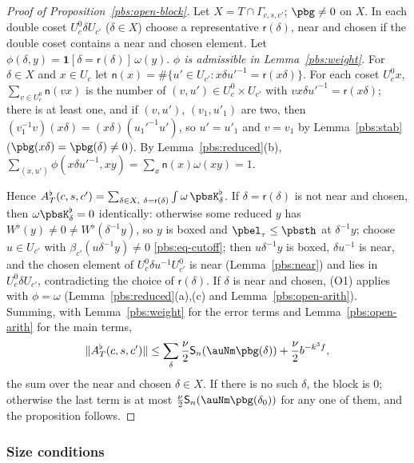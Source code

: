 \documentclass[10pt]{amsart}
\theoremstyle{definition}
\theoremstyle{remark}
\begin{document}
\begin{proof}[Proof of Proposition~\ref{pbs:open-block}]
Let $X=T\cap\Gamma_{c,s,c'}$; $\pbg\ne0$ on $X$. In each double coset $U^0_c\delta U_{c'}$ ($\delta\in X$)
choose a representative $\mathsf r(\delta)$, near and chosen if the double coset contains a near and chosen
element. Let $\phi(\delta,y)=\mathbf 1[\delta=\mathsf r(\delta)]\,\omega(y)$. \emph{$\phi$ is admissible in
Lemma~\ref{pbs:weight}.} For $\delta\in X$ and $x\in U_c$ let $\mathsf n(x)=\#\{u'\in U_{c'}:x\delta u'^{-1}=
\mathsf r(x\delta)\}$. For each coset $U^0_cx$, $\sum_{v\in U^0_c}\mathsf n(vx)$ is the number of $(v,u')\in
U^0_c\times U_{c'}$ with $vx\delta u'^{-1}=\mathsf r(x\delta)$; there is at least one, and if $(v,u')$,
$(v_1,u'_1)$ are two, then $(v_1^{-1}v)(x\delta)=(x\delta)(u_1'^{-1}u')$, so $u'=u'_1$ and $v=v_1$ by
Lemma~\ref{pbs:stab} ($\pbg(x\delta)=\pbg(\delta)\ne0$). By Lemma~\ref{pbs:reduced}(b),
$\sum_{(x,u')}\phi(x\delta u'^{-1},xy)=\sum_x\mathsf n(x)\omega(xy)=1$.

Hence $A^\flat_T(c,s,c')=\sum_{\delta\in X,\ \delta=\mathsf r(\delta)}\int\omega\,\pbsK^\flat_\delta$. If $\delta=
\mathsf r(\delta)$ is not near and chosen, then $\omega\pbsK^\flat_\delta=0$ identically: otherwise some reduced
$y$ has $W^\flat(y)\ne0\ne W^\flat(\delta^{-1}y)$, so $y$ is boxed and $\pbel_\tau\le\pbsth$ at $\delta^{-1}y$;
choose $u\in U_{c'}$ with $\beta_{c'}(u\delta^{-1}y)\ne0$ \eqref{pbs:eq-cutoff}; then $u\delta^{-1}y$ is boxed,
$\delta u^{-1}$ is near, and the chosen element of $U^0_c\delta u^{-1}U^0_{c'}$ is near
(Lemma~\ref{pbs:near}) and lies in $U^0_c\delta U_{c'}$, contradicting the choice of $\mathsf r(\delta)$. If
$\delta$ is near and chosen, (O1) applies with $\phi=\omega$ (Lemma~\ref{pbs:reduced}(a),(c) and
Lemma~\ref{pbs:open-arith}). Summing, with Lemma~\ref{pbs:weight} for the error terms and
Lemma~\ref{pbs:open-arith} for the main terms,
\[
\|A^\flat_T(c,s,c')\|\le\sum_{\delta}\frac\nu2\mathsf S_n(\auNm\pbg(\delta))+\frac\nu2b^{-k^3f},
\]
the sum over the near and chosen $\delta\in X$. If there is no such $\delta$, the block is $0$; otherwise
the last term is at most $\frac\nu2\mathsf S_n(\auNm\pbg(\delta_0))$ for any one of them, and the
proposition follows.
\end{proof}

\subsubsection{Size conditions}\label{pbs:ss-sizes}
\end{document}
